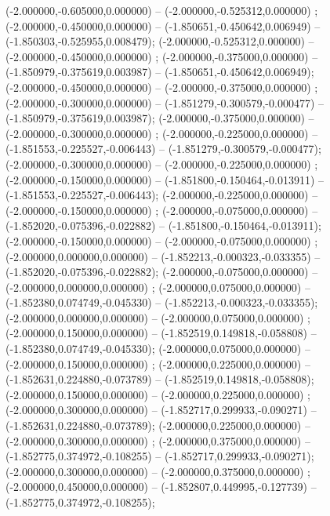  (-2.000000,-0.605000,0.000000) -- (-2.000000,-0.525312,0.000000) ;
 (-2.000000,-0.450000,0.000000) -- (-1.850651,-0.450642,0.006949) -- (-1.850303,-0.525955,0.008479);
 (-2.000000,-0.525312,0.000000) -- (-2.000000,-0.450000,0.000000) ;
 (-2.000000,-0.375000,0.000000) -- (-1.850979,-0.375619,0.003987) -- (-1.850651,-0.450642,0.006949);
 (-2.000000,-0.450000,0.000000) -- (-2.000000,-0.375000,0.000000) ;
 (-2.000000,-0.300000,0.000000) -- (-1.851279,-0.300579,-0.000477) -- (-1.850979,-0.375619,0.003987);
 (-2.000000,-0.375000,0.000000) -- (-2.000000,-0.300000,0.000000) ;
 (-2.000000,-0.225000,0.000000) -- (-1.851553,-0.225527,-0.006443) -- (-1.851279,-0.300579,-0.000477);
 (-2.000000,-0.300000,0.000000) -- (-2.000000,-0.225000,0.000000) ;
 (-2.000000,-0.150000,0.000000) -- (-1.851800,-0.150464,-0.013911) -- (-1.851553,-0.225527,-0.006443);
 (-2.000000,-0.225000,0.000000) -- (-2.000000,-0.150000,0.000000) ;
 (-2.000000,-0.075000,0.000000) -- (-1.852020,-0.075396,-0.022882) -- (-1.851800,-0.150464,-0.013911);
 (-2.000000,-0.150000,0.000000) -- (-2.000000,-0.075000,0.000000) ;
 (-2.000000,0.000000,0.000000) -- (-1.852213,-0.000323,-0.033355) -- (-1.852020,-0.075396,-0.022882);
 (-2.000000,-0.075000,0.000000) -- (-2.000000,0.000000,0.000000) ;
 (-2.000000,0.075000,0.000000) -- (-1.852380,0.074749,-0.045330) -- (-1.852213,-0.000323,-0.033355);
 (-2.000000,0.000000,0.000000) -- (-2.000000,0.075000,0.000000) ;
 (-2.000000,0.150000,0.000000) -- (-1.852519,0.149818,-0.058808) -- (-1.852380,0.074749,-0.045330);
 (-2.000000,0.075000,0.000000) -- (-2.000000,0.150000,0.000000) ;
 (-2.000000,0.225000,0.000000) -- (-1.852631,0.224880,-0.073789) -- (-1.852519,0.149818,-0.058808);
 (-2.000000,0.150000,0.000000) -- (-2.000000,0.225000,0.000000) ;
 (-2.000000,0.300000,0.000000) -- (-1.852717,0.299933,-0.090271) -- (-1.852631,0.224880,-0.073789);
 (-2.000000,0.225000,0.000000) -- (-2.000000,0.300000,0.000000) ;
 (-2.000000,0.375000,0.000000) -- (-1.852775,0.374972,-0.108255) -- (-1.852717,0.299933,-0.090271);
 (-2.000000,0.300000,0.000000) -- (-2.000000,0.375000,0.000000) ;
 (-2.000000,0.450000,0.000000) -- (-1.852807,0.449995,-0.127739) -- (-1.852775,0.374972,-0.108255);
